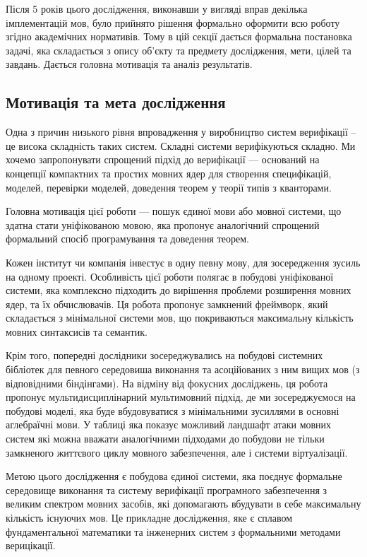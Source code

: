 Після 5 років цього дослідження, виконавши у вигляді вправ декілька імплементацій мов,
було прийнято рішення формально оформити всю роботу згідно академічних нормативів.
Тому в цій секції дається формальна постановка задачі, яка складається з опису
об'єкту та предмету дослідження, мети, цілей та завдань.
Дається головна мотивація та аналіз результатів.

\subsection{Мотивація та мета дослідження}
Одна з причин низького рівня впровадження у виробництво систем
верифікації -- це висока складність таких систем. Складні системи
верифікуються складно. Ми хочемо запропонувати спрощений
підхід до верифікації --- оснований на концепції компактних
та простих мовних ядер для створення специфікацій, моделей,
перевірки моделей, доведення теорем у теорії типів з кванторами.

Головна мотивація цієї роботи --- пошук єдиної мови або мовної системи,
що здатна стати уніфікованою мовою, яка пропонує аналогічний спрощений
формальний спосіб програмування та доведення теорем.

Кожен інститут чи компанія інвестує в одну певну мову, для зосередження зусиль на одному проекті.
Особливість цієї роботи полягає в побудові уніфікованої системи, яка комплексно підходить
до вирішення проблеми розширення мовних ядер, та їх обчислювачів. Ця робота
пропонує замкнений фреймворк, який складається з мінімальної системи мов,
що покриваються максимальну кількість мовних синтаксисів та семантик.

Крім того, попередні дослідники зосереджувались на побудові системних бібліотек для
певного середовиша виконання та асоційованих з ним вищих мов (з відповідними біндінгами).
На відміну від фокусних досліджень, ця робота пропонує мультидисциплінарний мультимовний підхід,
де ми зосереджуємося на побудові моделі, яка буде вбудовуватися з мінімальними
зусиллями в основні аглебраїчні мови. У таблиці яка показує можливий ландшафт атаки
мовних систем які можна вважати аналогічними підходами до побудови не тільки замкненого
життєвого циклу мовного забезпечення, але і системи віртуалізації.

Метою цього дослідження є побудова єдиної системи, яка поєднує формальне середовище
виконання та систему верифікації програмного забезпечення з великим спектром мовних
засобів, які допомагають вбудувати в себе максимальну кількість існуючих мов.
Це прикладне дослідження, яке є сплавом фундаментальної математики та інженерних
систем з формальними методами верицікації.

